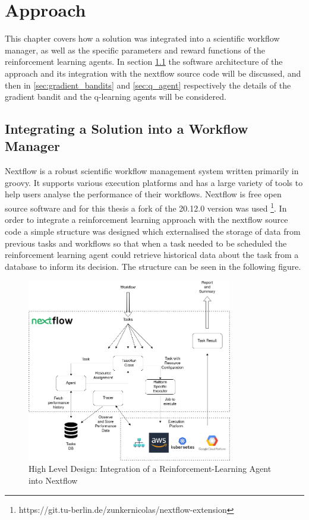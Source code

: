 
\cleardoublepage
\chapter{Approach}
\label{cha:approach}


This chapter covers how a solution was integrated into a scientific workflow manager, as well as the specific parameters and reward functions of the reinforcement learning agents. In section \ref{sec:integration} the software architecture of the approach and its integration with the nextflow source code will be discussed, and then in \ref{sec:gradient_bandits} and \ref{sec:q_agent} respectively the details of the gradient bandit and the q-learning agents will be considered. 

\section{Integrating a Solution into a Workflow Manager}
\label{sec:integration}

Nextflow \cite{nextflow} is a robust scientific workflow management system written primarily in groovy. It supports various execution platforms and has a large variety of tools to help users analyse the performance of their workflows. Nextflow is free open source software and for this thesis a fork of the 20.12.0 version was used \footnote{https://git.tu-berlin.de/zunkernicolas/nextflow-extension}. In order to integrate a reinforcement learning approach with the nextflow source code a simple structure was designed which externalised the storage of data from previous tasks and workflows so that when a task needed to be scheduled the reinforcement learning agent could retrieve historical data about the task from a database to inform its decision. The structure can be seen in the following figure.

\begin{figure}[ht]
    \centering
        \includegraphics[width=0.8\textwidth]{fig/implementation_diagram.png}
        \caption{High Level Design: Integration of a Reinforcement-Learning Agent into Nextflow}
        \label{fig:implementation}
\end{figure}


